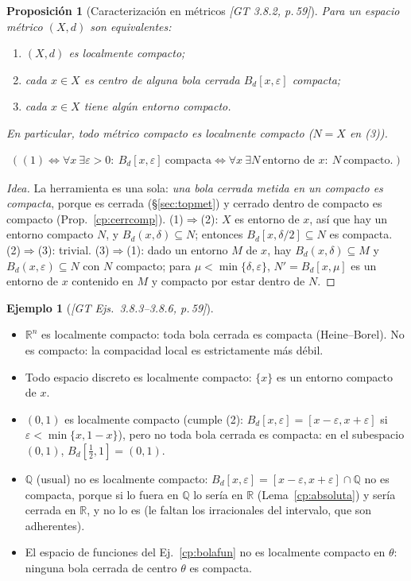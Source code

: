 \documentclass[11pt,a4paper]{article}
\newenvironment{lista}{\leavevmode\begin{itemize}[leftmargin=1.5em,itemsep=1pt,topsep=2pt,parsep=0pt]}{\end{itemize}}
\newcommand{\lgc}[1]{\par\vspace{-3pt}\begin{gather*}\big(\;#1\;\big)\end{gather*}\vspace{-6pt}}
\theoremstyle{definition}
\newtheorem{ejemplo}[definicion]{Ejemplo}
\theoremstyle{plain}
\newtheorem{proposicion}[definicion]{Proposición}
\newcommand{\fnt}[1]{{\normalfont\small\itshape\color{gray!150!black}[#1]}}
\newcommand{\R}{\mathbb{R}}
\newcommand{\Q}{\mathbb{Q}}
\newcommand{\Bola}[2]{B_d(#1,#2)}
\newcommand{\Bolac}[2]{B_d[#1,#2]}
\begin{document}
\begin{proposicion}[Caracterización en métricos \fnt{GT 3.8.2, p.\,59}]\label{cp:lcmet}
Para un espacio métrico $(X,d)$ son equivalentes:
\begin{enumerate}[label=(\arabic*),leftmargin=2.2em,itemsep=0pt]
\item $(X,d)$ es localmente compacto;
\item cada $x\in X$ es centro de alguna bola cerrada $\Bolac{x}{\varepsilon}$ compacta;
\item cada $x\in X$ tiene \emph{algún} entorno compacto.
\end{enumerate}
En particular, todo métrico compacto es localmente compacto ($N=X$ en (3)).
\lgc{(1)\iff \forall x\ \exists\varepsilon>0:\ \Bolac{x}{\varepsilon}\ \text{compacta}\iff \forall x\ \exists N\ \text{entorno de } x:\ N\ \text{compacto}.}
\end{proposicion}

\begin{proof}[Idea]
La herramienta es una sola: \emph{una bola cerrada metida en un compacto es compacta}, porque es cerrada (\S\ref{sec:topmet}) y cerrado dentro de compacto es compacto (Prop.~\ref{cp:cerrcomp}). (1)$\Rightarrow$(2): $X$ es entorno de $x$, así que hay un entorno compacto $N$, y $\Bola{x}{\delta}\subseteq N$; entonces $\Bolac{x}{\delta/2}\subseteq N$ es compacta. (2)$\Rightarrow$(3): trivial. (3)$\Rightarrow$(1): dado un entorno $M$ de $x$, hay $\Bola{x}{\delta}\subseteq M$ y $\Bola{x}{\varepsilon}\subseteq N$ con $N$ compacto; para $\mu<\min\{\delta,\varepsilon\}$, $N'=\Bolac{x}{\mu}$ es un entorno de $x$ contenido en $M$ y compacto por estar dentro de $N$.
\end{proof}

\begin{ejemplo}[\fnt{GT Ejs.\ 3.8.3--3.8.6, p.\,59}]\label{cp:ejlc}
\begin{lista}
\item $\R^n$ es localmente compacto: toda bola cerrada es compacta (Heine--Borel). No es compacto: la compacidad local es estrictamente más débil.
\item Todo espacio discreto es localmente compacto: $\{x\}$ es un entorno compacto de $x$.
\item $(0,1)$ es localmente compacto (cumple (2): $\Bolac{x}{\varepsilon}=[x-\varepsilon,x+\varepsilon]$ si $\varepsilon<\min\{x,1-x\}$), pero no toda bola cerrada es compacta: en el subespacio $(0,1)$, $\Bolac{\tfrac12}{1}=(0,1)$.
\item $\Q$ (usual) no es localmente compacto: $\Bolac{x}{\varepsilon}=[x-\varepsilon,x+\varepsilon]\cap\Q$ no es compacta, porque si lo fuera en $\Q$ lo sería en $\R$ (Lema~\ref{cp:absoluta}) y sería cerrada en $\R$, y no lo es (le faltan los irracionales del intervalo, que son adherentes).
\item El espacio de funciones del Ej.~\ref{cp:bolafun} no es localmente compacto en $\theta$: ninguna bola cerrada de centro $\theta$ es compacta.
\end{lista}
\end{ejemplo}
\end{document}
